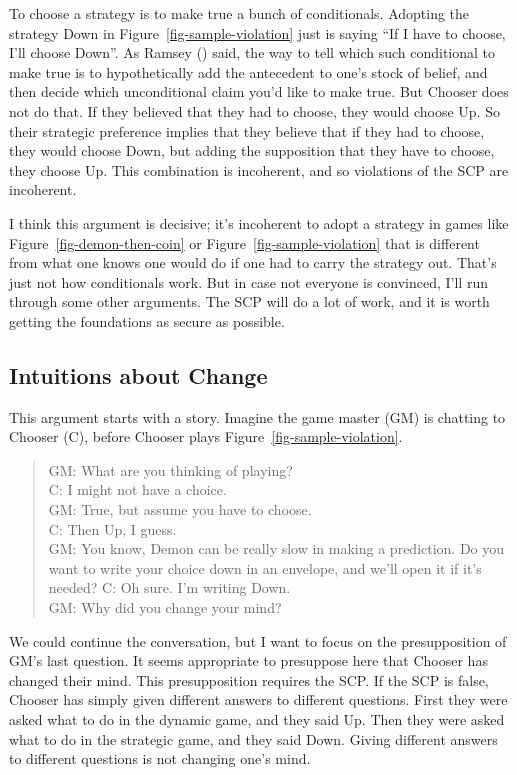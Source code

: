 \documentclass[
  10pt,
  letterpaper,
  DIV=11,
  numbers=noendperiod,
  twoside]{scrartcl}
\begin{document}
To choose a strategy is to make true a bunch of conditionals. Adopting
the strategy Down in Figure~\ref{fig-sample-violation} just is saying
``If I have to choose, I'll choose Down''. As Ramsey
() said, the way to
tell which such conditional to make true is to hypothetically add the
antecedent to one's stock of belief, and then decide which unconditional
claim you'd like to make true. But Chooser does not do that. If they
believed that they had to choose, they would choose Up. So their
strategic preference implies that they believe that if they had to
choose, they would choose Down, but adding the supposition that they
have to choose, they choose Up. This combination is incoherent, and so
violations of the SCP are incoherent.

I think this argument is decisive; it's incoherent to adopt a strategy
in games like Figure~\ref{fig-demon-then-coin} or
Figure~\ref{fig-sample-violation} that is different from what one knows
one would do if one had to carry the strategy out. That's just not how
conditionals work. But in case not everyone is convinced, I'll run
through some other arguments. The SCP will do a lot of work, and it is
worth getting the foundations as secure as possible.

\subsection{Intuitions about Change}\label{sec-intuitions-change}

This argument starts with a story. Imagine the game master (GM) is
chatting to Chooser (C), before Chooser plays
Figure~\ref{fig-sample-violation}.

\begin{quote}
GM: What are you thinking of playing?\\
C: I might not have a choice.\\
GM: True, but assume you have to choose.\\
C: Then Up, I guess.\\
GM: You know, Demon can be really slow in making a prediction. Do you
want to write your choice down in an envelope, and we'll open it if it's
needed? C: Oh sure. I'm writing Down.\\
GM: Why did you change your mind?
\end{quote}

We could continue the conversation, but I want to focus on the
presupposition of GM's last question. It seems appropriate to presuppose
here that Chooser has changed their mind. This presupposition requires
the SCP. If the SCP is false, Chooser has simply given different answers
to different questions. First they were asked what to do in the dynamic
game, and they said Up. Then they were asked what to do in the strategic
game, and they said Down. Giving different answers to different
questions is not changing one's mind.
\end{document}
